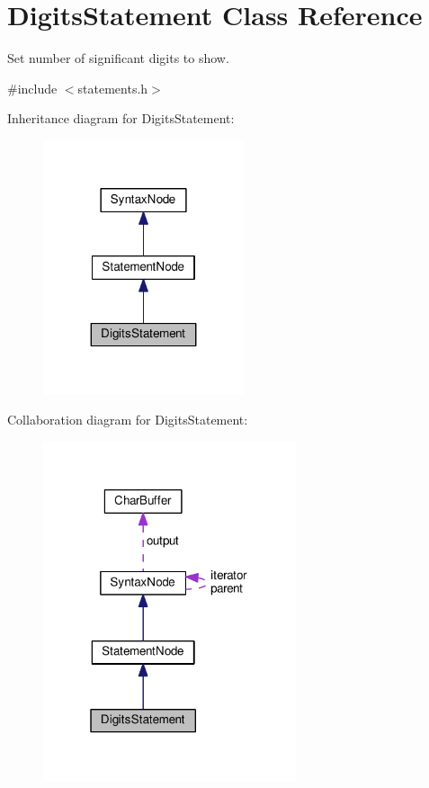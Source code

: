 \hypertarget{classDigitsStatement}{}\section{Digits\+Statement Class Reference}
\label{classDigitsStatement}


Set number of significant digits to show.  




{\ttfamily \#include $<$statements.\+h$>$}



Inheritance diagram for Digits\+Statement\+:
\nopagebreak
\begin{figure}[H]
\begin{center}
\leavevmode
\includegraphics[width=167pt]{dc/de8/classDigitsStatement__inherit__graph}
\end{center}
\end{figure}


Collaboration diagram for Digits\+Statement\+:
\nopagebreak
\begin{figure}[H]
\begin{center}
\leavevmode
\includegraphics[width=211pt]{de/d57/classDigitsStatement__coll__graph}
\end{center}
\end{figure}
